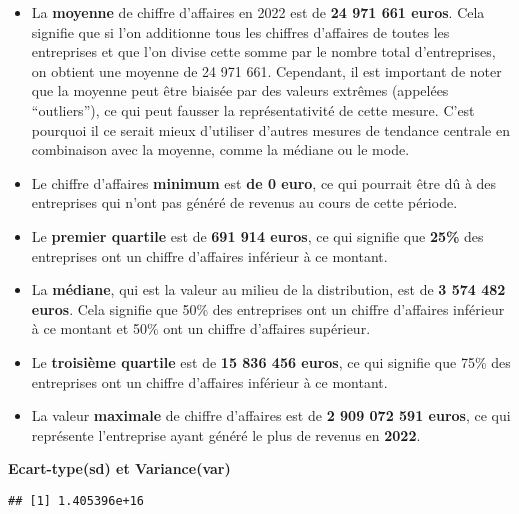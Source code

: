 \documentclass[mstat,12pt]{unswthesis}
\newenvironment{Shaded}{\begin{snugshade}}{\end{snugshade}}
\newcommand{\CommentTok}[1]{\textcolor[rgb]{0.56,0.35,0.01}{\textit{#1}}}
\newcommand{\FunctionTok}[1]{\textcolor[rgb]{0.00,0.00,0.00}{#1}}
\newcommand{\NormalTok}[1]{#1}
\newcommand{\SpecialCharTok}[1]{\textcolor[rgb]{0.00,0.00,0.00}{#1}}
\begin{document}
\begin{itemize}
\item
  La \textbf{moyenne} de chiffre d'affaires en 2022 est de \textbf{24
  971 661 euros}. Cela signifie que si l'on additionne tous les chiffres
  d'affaires de toutes les entreprises et que l'on divise cette somme
  par le nombre total d'entreprises, on obtient une moyenne de 24 971
  661. Cependant, il est important de noter que la moyenne peut être
  biaisée par des valeurs extrêmes (appelées ``outliers''), ce qui peut
  fausser la représentativité de cette mesure. C'est pourquoi il ce
  serait mieux d'utiliser d'autres mesures de tendance centrale en
  combinaison avec la moyenne, comme la médiane ou le mode.
\item
  Le chiffre d'affaires \textbf{minimum} est \textbf{de 0 euro}, ce qui
  pourrait être dû à des entreprises qui n'ont pas généré de revenus au
  cours de cette période.
\item
  Le \textbf{premier quartile} est de \textbf{691 914 euros}, ce qui
  signifie que \textbf{25\%} des entreprises ont un chiffre d'affaires
  inférieur à ce montant.
\item
  La \textbf{médiane}, qui est la valeur au milieu de la distribution,
  est de \textbf{3 574 482 euros}. Cela signifie que 50\% des
  entreprises ont un chiffre d'affaires inférieur à ce montant et 50\%
  ont un chiffre d'affaires supérieur.
\item
  Le \textbf{troisième quartile} est de \textbf{15 836 456 euros}, ce
  qui signifie que 75\% des entreprises ont un chiffre d'affaires
  inférieur à ce montant.
\item
  La valeur \textbf{maximale} de chiffre d'affaires est de \textbf{2 909
  072 591 euros}, ce qui représente l'entreprise ayant généré le plus de
  revenus en \textbf{2022}.
\end{itemize}

\textbf{Ecart-type(sd) et Variance(var)}

\begin{Shaded}
\end{Shaded}

\begin{verbatim}
## [1] 1.405396e+16
\end{verbatim}

\begin{Shaded}
\end{Shaded}
\end{document}

